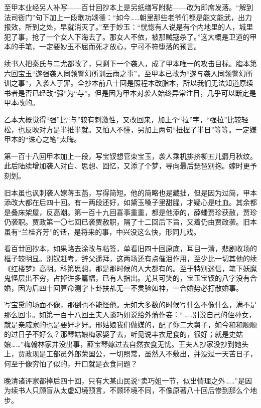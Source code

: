 \par 至甲本业经另人补写——百廿回抄本上是另纸缮写附黏——改为即席发落。“解到法司衙门”句下加上一段歌功颂德：“如今……朝里那些老爷们都是能文能武，出力报效，所到之处，早就消灭了。”至于妙玉：“恍惚有人说是有个内地里的人，城里犯了事，抢了一个女人下海去了。那女人不依，被那贼寇杀了。”这大概是卫道的甲本的手笔，一定要妙玉不屈而死才放心，宁可不符堕落的预言。
\par 续书人把秦氏与二尤都改了，只剩下一个袭人，成了甲本唯一的攻击目标。脂本第六回宝玉“遂强袭人同领警幻所训云雨之事”，至甲本已改为“遂与袭人同领警幻所训之事”，入袭人于罪。全抄本前八十回是照程本改脂本，所以我们无法知道原续书者是否已经改“强”为“与”。但是因为甲本对袭人始终异常注目，几乎可以断定是甲本改的。
\par 乙本大概觉得“强”比“与”较有刺激性，又改回来，加上个“拉”字，“强拉”比较轻松，也反映对方是半推半就。又怕人不懂，另加上两句“扭捏了半日”等等。一定嫌甲本的“诛心之笔”太晦。
\par 第一百十八回甲本加上一段，写宝钗想管束宝玉，袭人乘机排挤柳五儿麝月秋纹。此后陆续增加袭人对白、思想、回忆，又添了个梦，导向最后琵琶别抱。嫁时更予刻划。
\par 旧本虽也讽刺袭人嫁蒋玉菡，写得简短。他的简略也是藏拙，但是因为过简，甲本添改大都在后四十回。有一两段还好，如黛玉嗓子里甜腥，才疑心是吐血。其余都是叠床架屋，反高潮。第一百十九回喜事重重，都是他添的，薛蟠贾珍获赦，贾珍仍袭职。贾政第一〇七回已袭贾赦职，隔了十二回后下旨，又着仍由贾政袭。旧本虽有“兰桂齐芳”的话，是将来的事，中兴没这么快，形同儿戏。
\par 看百廿回抄本，如果略去涂改与粘签，单看旧四十回原底，耳目一清，悲剧收场的框子较明显。别钗赶考，辞父遥拜，这两场还有点催泪作用，至少比一切其他的续《红楼梦》高明。科第思想，那是那时候的人大都有的。至于特别迷信，笔下妖魔鬼怪层出不穷，占掉许多篇幅，已有人指出。尤其可笑的，宝玉宝钗的八字没有合婚，因为后四十回算命测字卜卦扶乩无一不灵验如神，一合婚势必打散婚事。
\par 写宝黛的场面不像，那倒也不能怪他。无如大多数的时候写什么不像什么，满不是那么回事。如第一百十八回王夫人谈巧姐说给外藩作妾：“……别说自己的侄孙女，就是亲戚家的也是要好才好。邢姑娘我们做媒的，配了你二大舅子，如今和和顺顺的过日子不好么？那琴姑娘梅家娶了去，听见说丰衣足食的，很好；就是史姑娘……”梅翰林家并没出事，薛宝琴嫁过去自然衣食无忧。王夫人抄家没抄到她头上，贾政现是工部员外郎荣国公，一切照常，虽然入不敷出，并没过一天苦日子，何至于像穷怕了似的，开口就是衣食问题？
\par 晚清诸评家都捧后四十回，只有大某山民说“卖巧姐一节，似出情理之外……”是因为续书人只顾盲从太虚幻境预言，不顾环境不同，不像原著八十回后惨到那么个地步。
